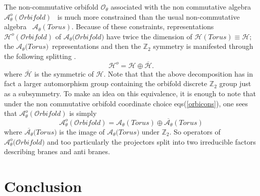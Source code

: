 \documentclass[a4paper,12pt]{article}
\begin{document}
The non-commutative orbifold $\mathcal{O}_{\theta }$ associated
with the non commutative algebra $\mathcal{A}^{o}_{\theta
}(\mathcal{O}rbifold)$ \
is much more constrained than the usual non-commutative algebra \ $\mathcal{A%
}_{\theta }(Torus)$. Because of these constraints,
representations $\mathcal{H}^{o}(\mathcal{O}rbifold)$ of
  $\mathcal{A}_{\theta }%
\mathcal{(O}rbifold\mathcal{)}$ have twice the dimension of $\mathcal{H}%
(Torus)\equiv \mathcal{H};$ the $\mathcal{A}_{\theta }\mathcal{(}Torus%
\mathcal{)}$\ representations and then the $\mathbb{Z}_{2}$ symmetry is
manifested through the following splitting .
\begin{equation*}
\mathcal{H}^{o}=\mathcal{H}\oplus \overline{\mathcal{H}}.
\end{equation*}
where $\overline{\mathcal{H}}$ is the symmetric of $\mathcal{H}$. Note that
that the above decomposition has in fact a larger automorphism group
containing the orbifold discrete $\mathbb{Z}_{2}$ group just as a
subsymmetry. To
make an idea on this equivalence, it is enough to note that under the non
commutative orbifold coordinate choice eqs(\ref{orbicons}), one sees that $\mathcal{A}%
^{o}_{\theta }(\mathcal{O}rbifold)$ is simply
\begin{equation*}
\mathcal{A}^{o}_{\theta }(\mathcal{O}rbifold)=\mathcal{A}_{\theta }(Torus)\oplus
\overline{\mathcal{A}_{\theta }}(Torus)
\end{equation*}
where $\overline{\mathcal{A}_{\theta }}\mathcal{(}Torus\mathcal{)}$ is the
image of $\mathcal{A}_{\theta }\mathcal{(}Torus\mathcal{)}$ under $\mathbb{Z}_{2}.$ So operators of $%
\mathcal{A}^{o}_{\theta }\mathcal{(O}rbifold\mathcal{)}$ and too
particularly the projectors split into two irreducible factors
describing branes and anti branes.

\section{Conclusion}
\end{document}
